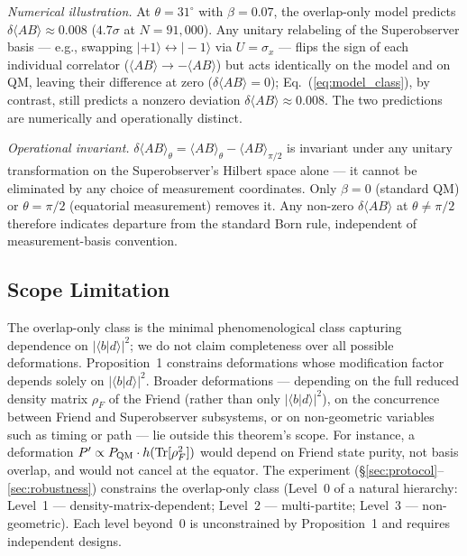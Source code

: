 \documentclass[twocolumn,aps,pra,superscriptaddress,floatfix,10pt]{revtex4-2}
\begin{document}
\emph{Numerical illustration.} At $\theta = 31^\circ$ with $\beta = 0.07$, the overlap-only
model predicts $\delta\langle AB\rangle \approx 0.008$ ($4.7\sigma$ at $N = 91{,}000$). Any unitary
relabeling of the Superobserver basis --- e.g., swapping $|+1\rangle \leftrightarrow |-1\rangle$
via $U = \sigma_x$ --- flips the sign of each individual correlator
($\langle AB\rangle \to -\langle AB\rangle$) but acts identically on the model and on QM, leaving
their difference at zero ($\delta\langle AB\rangle = 0$); Eq.~(\ref{eq:model_class}), by contrast, still
predicts a nonzero deviation $\delta\langle AB\rangle \approx 0.008$. The two
predictions are numerically and operationally distinct.

\emph{Operational invariant.} $\delta\langle AB\rangle_\theta = \langle AB\rangle_\theta - \langle AB\rangle_{\pi/2}$ is invariant
under any unitary transformation on the Superobserver's Hilbert space
alone --- it cannot be eliminated by any choice of measurement coordinates.
Only $\beta = 0$ (standard QM) or $\theta = \pi/2$ (equatorial measurement) removes it.
Any non-zero $\delta\langle AB\rangle$ at $\theta \neq \pi/2$ therefore indicates departure from the
standard Born rule, independent of measurement-basis convention.

\subsection{Scope Limitation}
\label{sec:scope}

The overlap-only class is the minimal phenomenological
class capturing dependence on $|\langle b|d\rangle|^2$; we do not claim completeness over all
possible deformations. Proposition~1 constrains deformations whose
modification factor depends solely on $|\langle b|d\rangle|^2$. Broader deformations ---
depending on the full reduced density matrix $\rho_F$ of the Friend (rather than
only $|\langle b|d\rangle|^2$), on the concurrence between Friend and Superobserver
subsystems, or on non-geometric variables such as timing or path --- lie
outside this theorem's scope. For instance, a deformation
$P' \propto P_{\rm QM} \cdot h(\text{Tr}[\rho_F^2])$ would depend on Friend state purity, not basis
overlap, and would not cancel at the equator. The experiment (\S\ref{sec:protocol}--\ref{sec:robustness}) constrains the overlap-only class (Level~0 of a
natural hierarchy: Level~1 --- density-matrix-dependent; Level~2 ---
multi-partite; Level~3 --- non-geometric). Each level beyond~0 is
unconstrained by Proposition~1 and requires independent designs.
\end{document}
